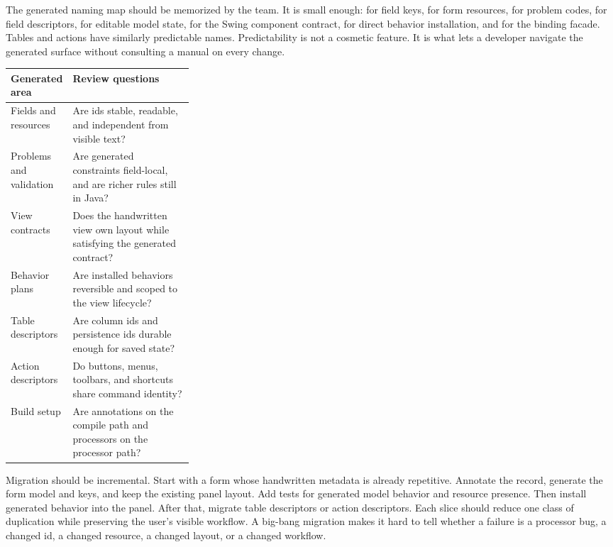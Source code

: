 The generated naming map should be memorized by the team. It is small enough:
 for field keys,  for form
resources,  for problem codes,
 for field descriptors,
 for editable model state, 
for the Swing component contract,  for direct
behavior installation, and  for the binding facade.
Tables and actions have similarly predictable names. Predictability is not a
cosmetic feature. It is what lets a developer navigate the generated surface
without consulting a manual on every change.

\begin{tabularx}{0.96\linewidth}{@{}p{0.30\linewidth}X@{}}
\toprule
Generated area & Review questions\\
\midrule
Fields and resources & Are ids stable, readable, and independent from visible text?\\
Problems and validation & Are generated constraints field-local, and are richer rules still in Java?\\
View contracts & Does the handwritten view own layout while satisfying the generated contract?\\
Behavior plans & Are installed behaviors reversible and scoped to the view lifecycle?\\
Table descriptors & Are column ids and persistence ids durable enough for saved state?\\
Action descriptors & Do buttons, menus, toolbars, and shortcuts share command identity?\\
Build setup & Are annotations on the compile path and processors on the processor path?\\
\bottomrule
\end{tabularx}

Migration should be incremental. Start with a form whose handwritten metadata
is already repetitive. Annotate the record, generate the form model and keys,
and keep the existing panel layout. Add tests for generated model behavior and
resource presence. Then install generated behavior into the panel. After that,
migrate table descriptors or action descriptors. Each slice should reduce one
class of duplication while preserving the user's visible workflow. A
big-bang migration makes it hard to tell whether a failure is a processor bug,
a changed id, a changed resource, a changed layout, or a changed workflow.

